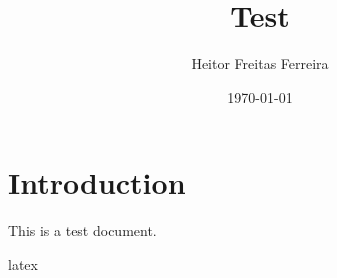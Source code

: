 \documentclass[]{article}
\begin{document}
\title{Test}
\author{Heitor Freitas Ferreira}
\date{\today}
\maketitle

\section{Introduction}
This is a test document.

latex
\end{document}
